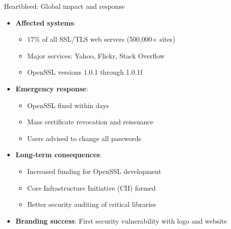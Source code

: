 \documentclass[aspectratio=169, lualatex, handout]{beamer}
\begin{document}
\begin{frame}{Heartbleed: Global impact and response}
	\begin{itemize}
		\item \textbf{Affected systems}:
		      \begin{itemize}
			      \item 17\% of all SSL/TLS web servers (500,000+ sites)
			      \item Major services: Yahoo, Flickr, Stack Overflow
			      \item OpenSSL versions 1.0.1 through 1.0.1f
		      \end{itemize}
		\item \textbf{Emergency response}:
		      \begin{itemize}
			      \item OpenSSL fixed within days
			      \item Mass certificate revocation and reissuance
			      \item Users advised to change all passwords
		      \end{itemize}
		\item \textbf{Long-term consequences}:
		      \begin{itemize}
			      \item Increased funding for OpenSSL development
			      \item Core Infrastructure Initiative (CII) formed
			      \item Better security auditing of critical libraries
		      \end{itemize}
		\item \textbf{Branding success}: First security vulnerability with logo and website
	\end{itemize}
\end{frame}
\end{document}
